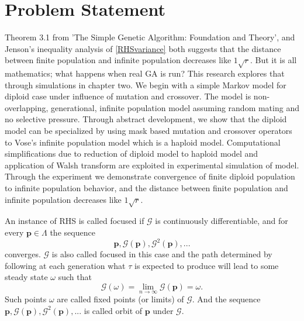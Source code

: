 \section{Problem Statement}
Theorem 3.1 from 'The Simple Genetic Algorithm: Foundation and Theory', 
and Jenson's inequality analysis of \ref{RHSvariance} both suggests that the distance between finite population and infinite population decreases like  
$1\sqrt{r}$. But it is all mathematics; what happens when real GA is run? This research explores that 
through simulations in chapter two. We begin with a simple Markov model for diploid case under influence of mutation and crossover. 
The model is non-overlapping, generational, infinite population model assuming random mating and no selective pressure. 
Through abstract development, we show that the diploid model can be specialized by using mask based 
mutation and crossover operators to Vose's infinite population model which is a haploid model. Computational 
simplifications due to reduction of diploid model to haploid model and application of Walsh transform 
are exploited in experimental simulation of model. Through the experiment we demonstrate convergence 
of finite diploid population to infinite population behavior, and the distance between finite population 
and infinite population decreases like $1\sqrt{r}$.

An instance of RHS is called focused if $\mathcal{G}$ is continuously differentiable, and for every $\bm{p}  \in  \Lambda$
the sequence
\[
\bm{p},  \mathcal{G}(\bm{p}),  {\mathcal{G}}^2(\bm{p}),...
\]
converges. $\mathcal{G}$ is also called focused in this case and the path determined by following at each generation what $\tau$ is expected 
to produce will lead to some steady state $\omega$ such that
\[
\mathcal{G}(\omega) = \lim_{n\to\infty} \mathcal{G}(\bm{p}) = \omega.
\]
Such points $\omega$ are called fixed points (or limits) of $\mathcal{G}$. 
And the sequence $\bm{p},  \mathcal{G}(\bm{p}),  {\mathcal{G}}^2(\bm{p}),...$ is called orbit of $\bm{p}$ under $\mathcal{G}$. 


